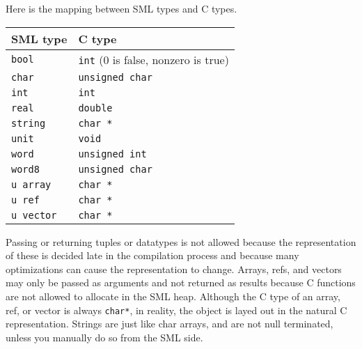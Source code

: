 Here is the mapping between SML types and C types.
\begin{center}
\begin{tabular}{ll}
SML type & C type\\
\hline
{\tt bool} & {\tt int} (0 is false, nonzero is true) \\
{\tt char} & {\tt unsigned char} \\
{\tt int} & {\tt int} \\
{\tt real} & {\tt double} \\
{\tt string} & {\tt char *} \\
{\tt unit} & {\tt void} \\
{\tt word} & {\tt unsigned int} \\
{\tt word8} & {\tt unsigned char} \\
{\tt u array} & {\tt char *} \\
{\tt u ref} & {\tt char *} \\
{\tt u vector} & {\tt char *} \\
\end{tabular}
\end{center}
Passing or returning tuples or datatypes is not allowed because the
representation of these is decided late in the compilation
process and because many optimizations can cause the representation to
change.  Arrays, refs, and vectors may only be passed as arguments and
not returned as results because C functions are not allowed to
allocate in the SML heap.  Although the C type of an array, ref, or
vector is always {\tt char*}, in reality, the object is layed out in
the natural C representation.
Strings are just
like char arrays, and are not null terminated, unless you manually do
so from the SML side.



